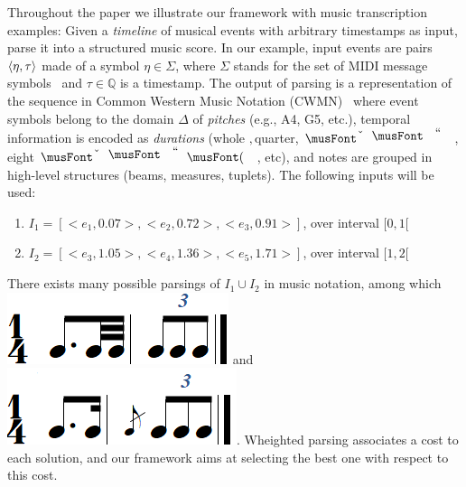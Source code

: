 \begin{example}
Throughout the paper we
illustrate our framework with music transcription examples: Given
a \emph{timeline} of musical events with arbitrary timestamps as input, parse it
into a structured music score. In our example, input events
are pairs $\< \eta, \tau>$ made of
a symbol $\eta \in \Sigma$, where $\Sigma$ stands for the
set of MIDI message symbols~\cite{?}
and  $\tau \in \mathbb{Q}$ is a timestamp. The output of parsing
is a representation of the sequence in
Common Western Music Notation (CWMN)~\cite{Gould11Notation}
where event symbols belong to the domain $\Delta$
of \emph{pitches} (e.g., A4, G5, etc.), temporal
information is encoded as \emph{durations} (whole \musWhole$,
$quarter, $\musQuarter$, eight $\musEighth$, etc), and notes are grouped in
high-level structures (beams, measures, tuplets). The following inputs
will be used:
\begin{enumerate}
  \item $I_1  = [ <e_1, 0.07>,<e_2, 0.72>,<e_3, 0.91>]$, over interval $[0,1[$
  \item $I_2  = [ <e_3, 1.05>,<e_4, 1.36>,<e_5, 1.71>]$, over interval $[1,2[$
\end{enumerate}
There exists many possible parsings of $I_1 \cup I_2$ in music notation, among
which
\includegraphics[scale=0.20]{pictures/score5.png}
and \includegraphics[scale=0.20]{pictures/score4.png}.  Wheighted
parsing associates a cost to each solution, and our framework
aims at selecting the best one with respect to this cost.
\endex
\end{example}
